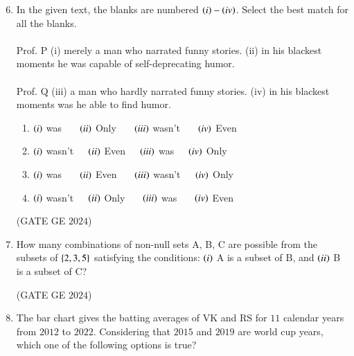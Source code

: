 \documentclass[journal,12pt,onecolumn]{IEEEtran}
\theoremstyle{remark}
\begin{document}
\begin{enumerate}
\setcounter{enumi}{5}
\item In the given text, the blanks are numbered $\left(i\right)-\left(iv\right)$.
Select the best match for all the blanks. \\
\\Prof. P \underline{\hspace{1cm}} (i) \underline{\hspace{1cm}} merely a man who narrated funny stories.
\underline{\hspace{1cm}} (ii) \underline{\hspace{1cm}} in his blackest moments he was capable of self-deprecating humor. \\
\\Prof.
Q \underline{\hspace{1cm}} (iii) \underline{\hspace{1cm}} a man who hardly narrated funny stories.
\underline{\hspace{1cm}} (iv) \underline{\hspace{1cm}} in his blackest moments was he able to find humor.
\begin{enumerate}
\item $\left(i\right)$ was \ \ \ $\left(ii\right)$ Only \ \ \   $\left(iii\right)$ wasn't \ \ \ $\left(iv\right)$ Even
\item $\left(i\right)$ wasn't\ \ \  $\left(ii\right)$ Even\ \ \  $\left(iii\right)$ was\ \ \  $\left(iv\right)$ Only
\item $\left(i\right)$ was \ \ \ $\left(ii\right)$ Even \ \ \ $\left(iii\right)$ wasn't\ \ \  $\left(iv\right)$ Only
\item $\left(i\right)$ wasn't\ \ \  $\left(ii\right)$ Only \ \ \ $\left(iii\right)$ was \ \ \ $\left(iv\right)$ Even
\end{enumerate}
\hfill{(GATE GE $2024$)}
\bigskip
\item How many combinations of non-null sets A, B, C are possible from the subsets of $\left\{2,3,5\right\}$ satisfying the conditions: $\left(i\right)$ A is a subset of B, and 
$\left(ii\right)$ B is a subset of C?
\begin{enumerate}
\end{enumerate}
\hfill{(GATE GE $2024$)}
\bigskip
\item The bar chart gives the batting averages of VK and RS for $11$ calendar years from $2012$ to $2022$. Considering that $2015$ and $2019$ are world cup years, which one of the following options is true?\\

\end{enumerate}
\end{document}
